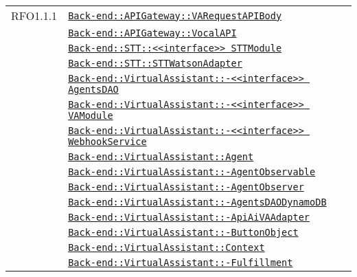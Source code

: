 \begin{longtable}{|>{\centering}m{3cm}|m{10cm}<{\centering}|}
RFO1.1.1 & \hyperref[Back-end::APIGateway::VARequestAPIBody]{\texttt{Back-end::APIGateway::VARequestAPIBody}}\\
& \hyperref[Back-end::APIGateway::VocalAPI]{\texttt{Back-end::APIGateway::VocalAPI}}\\
& \hyperref[Back-end::STT::<<interface>> STTModule]{\texttt{Back-end::STT::<<interface>> STTModule}}\\
& \hyperref[Back-end::STT::STTWatsonAdapter]{\texttt{Back-end::STT::STTWatsonAdapter}}\\
& \hyperref[Back-end::VirtualAssistant::<<interface>> AgentsDAO]{\texttt{Back-end::VirtualAssistant::-\linebreak <<interface>> AgentsDAO}}\\
& \hyperref[Back-end::VirtualAssistant::<<interface>> VAModule]{\texttt{Back-end::VirtualAssistant::-\linebreak <<interface>> VAModule}}\\
& \hyperref[Back-end::VirtualAssistant::<<interface>> WebhookService]{\texttt{Back-end::VirtualAssistant::-\linebreak <<interface>> WebhookService}}\\
& \hyperref[Back-end::VirtualAssistant::Agent]{\texttt{Back-end::VirtualAssistant::Agent}}\\
& \hyperref[Back-end::VirtualAssistant::AgentObservable]{\texttt{Back-end::VirtualAssistant::-\linebreak AgentObservable}}\\
& \hyperref[Back-end::VirtualAssistant::AgentObserver]{\texttt{Back-end::VirtualAssistant::-\linebreak AgentObserver}}\\
& \hyperref[Back-end::VirtualAssistant::AgentsDAODynamoDB]{\texttt{Back-end::VirtualAssistant::-\linebreak AgentsDAODynamoDB}}\\
& \hyperref[Back-end::VirtualAssistant::ApiAiVAAdapter]{\texttt{Back-end::VirtualAssistant::-\linebreak ApiAiVAAdapter}}\\
& \hyperref[Back-end::VirtualAssistant::ButtonObject]{\texttt{Back-end::VirtualAssistant::-\linebreak ButtonObject}}\\
& \hyperref[Back-end::VirtualAssistant::Context]{\texttt{Back-end::VirtualAssistant::Context}}\\
& \hyperref[Back-end::VirtualAssistant::Fulfillment]{\texttt{Back-end::VirtualAssistant::-\linebreak Fulfillment}}\\

\end{longtable}
